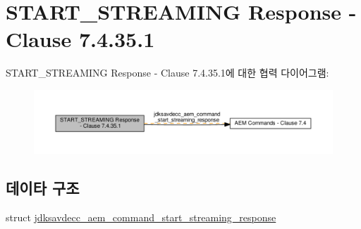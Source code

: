 \hypertarget{group__command__start__streaming__response}{}\section{S\+T\+A\+R\+T\+\_\+\+S\+T\+R\+E\+A\+M\+I\+NG Response -\/ Clause 7.4.35.1}
\label{group__command__start__streaming__response}
S\+T\+A\+R\+T\+\_\+\+S\+T\+R\+E\+A\+M\+I\+NG Response -\/ Clause 7.4.35.1에 대한 협력 다이어그램\+:
\nopagebreak
\begin{figure}[H]
\begin{center}
\leavevmode
\includegraphics[width=350pt]{group__command__start__streaming__response}
\end{center}
\end{figure}
\subsection*{데이타 구조}
\begin{DoxyCompactItemize}
\item 
struct \hyperlink{structjdksavdecc__aem__command__start__streaming__response}{jdksavdecc\+\_\+aem\+\_\+command\+\_\+start\+\_\+streaming\+\_\+response}
\end{DoxyCompactItemize}
